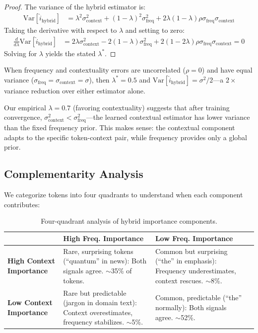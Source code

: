 \begin{proof}
The variance of the hybrid estimator is:
\begin{align}
    \text{Var}[\hat{i}_{\text{hybrid}}] &= \lambda^2 \sigma^2_{\text{context}} + (1{-}\lambda)^2 \sigma^2_{\text{freq}} + 2\lambda(1{-}\lambda)\rho \sigma_{\text{freq}} \sigma_{\text{context}}
\end{align}
Taking the derivative with respect to $\lambda$ and setting to zero:
\begin{align}
    \frac{d}{d\lambda}\text{Var}[\hat{i}_{\text{hybrid}}] &= 2\lambda\sigma^2_{\text{context}} - 2(1{-}\lambda)\sigma^2_{\text{freq}} + 2(1{-}2\lambda)\rho\sigma_{\text{freq}}\sigma_{\text{context}} = 0
\end{align}
Solving for $\lambda$ yields the stated $\lambda^*$.
\end{proof}

\begin{corollary}
When frequency and contextuality errors are uncorrelated ($\rho = 0$) and have equal variance ($\sigma_{\text{freq}} = \sigma_{\text{context}} = \sigma$), then $\lambda^* = 0.5$ and $\text{Var}[\hat{i}_{\text{hybrid}}] = \sigma^2/2$---a $2\times$ variance reduction over either estimator alone.
\end{corollary}

\begin{remark}
Our empirical $\lambda = 0.7$ (favoring contextuality) suggests that after training convergence, $\sigma^2_{\text{context}} < \sigma^2_{\text{freq}}$---the learned contextual estimator has lower variance than the fixed frequency prior. This makes sense: the contextual component adapts to the specific token-context pair, while frequency provides only a global prior.
\end{remark}

\subsection{Complementarity Analysis}

We categorize tokens into four quadrants to understand when each component contributes:

\begin{table}[h]
\centering
\caption{Four-quadrant analysis of hybrid importance components.}
\label{tab:quadrant}
\begin{tabular}{p{3.5cm}p{3.5cm}p{3.5cm}p{3.5cm}}
\toprule
& \textbf{High Freq. Importance} & \textbf{Low Freq. Importance} \\
\midrule
\textbf{High Context Importance} & Rare, surprising tokens (``quantum'' in news): Both signals agree. $\sim$35\% of tokens. & Common but surprising (``the'' in emphasis): Frequency underestimates, context rescues. $\sim$8\%. \\
\midrule
\textbf{Low Context Importance} & Rare but predictable (jargon in domain text): Context overestimates, frequency stabilizes. $\sim$5\%. & Common, predictable (``the'' normally): Both signals agree. $\sim$52\%. \\
\bottomrule
\end{tabular}
\end{table}

